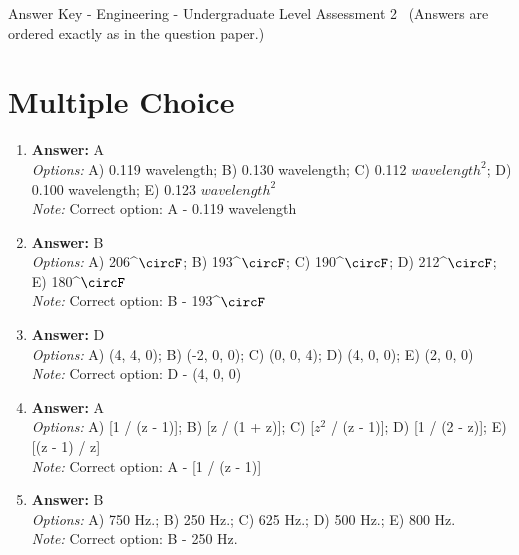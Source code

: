 \documentclass[12pt]{article}
\begin{document}
\begin{center}
Answer Key - Engineering - Undergraduate Level Assessment 2 \
\small (Answers are ordered exactly as in the question paper.)
\end{center}

\section*{Multiple Choice}
\begin{enumerate}[label=\arabic*.]
\item \textbf{Answer:} A
\\ \textit{Options:} A) 0.119 wavelength; B) 0.130 wavelength; C) 0.112 $wavelength^2$; D) 0.100 wavelength; E) 0.123 $wavelength^2$
\\ \textit{Note:} Correct option: A - 0.119 wavelength
\item \textbf{Answer:} B
\\ \textit{Options:} A) 206^\ensuremath{\circF}; B) 193^\ensuremath{\circF}; C) 190^\ensuremath{\circF}; D) 212^\ensuremath{\circF}; E) 180^\ensuremath{\circF}
\\ \textit{Note:} Correct option: B - 193^\ensuremath{\circF}
\item \textbf{Answer:} D
\\ \textit{Options:} A) (4, 4, 0); B) (-2, 0, 0); C) (0, 0, 4); D) (4, 0, 0); E) (2, 0, 0)
\\ \textit{Note:} Correct option: D - (4, 0, 0)
\item \textbf{Answer:} A
\\ \textit{Options:} A) [1 / (z - 1)]; B) [z / (1 + z)]; C) [$z^2$ / (z - 1)]; D) [1 / (2 - z)]; E) [(z - 1) / z]
\\ \textit{Note:} Correct option: A - [1 / (z - 1)]
\item \textbf{Answer:} B
\\ \textit{Options:} A) 750 Hz.; B) 250 Hz.; C) 625 Hz.; D) 500 Hz.; E) 800 Hz.
\\ \textit{Note:} Correct option: B - 250 Hz.
\end{enumerate}
\end{document}
